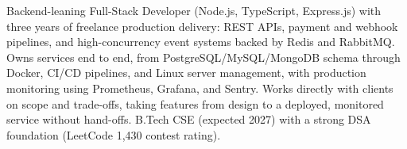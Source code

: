 \documentclass[11pt,a4paper,sans]{moderncv}
\begin{document}
\makecvtitle


\vspace{6pt}
\small{Backend-leaning Full-Stack Developer (Node.js, TypeScript, Express.js) with three years of freelance production delivery: REST APIs, payment and webhook pipelines, and high-concurrency event systems backed by Redis and RabbitMQ. Owns services end to end, from PostgreSQL/MySQL/MongoDB schema through Docker, CI/CD pipelines, and Linux server management, with production monitoring using Prometheus, Grafana, and Sentry. Works directly with clients on scope and trade-offs, taking features from design to a deployed, monitored service without hand-offs. B.Tech CSE (expected 2027) with a strong DSA foundation (LeetCode 1,430 contest rating).}

\end{document}
